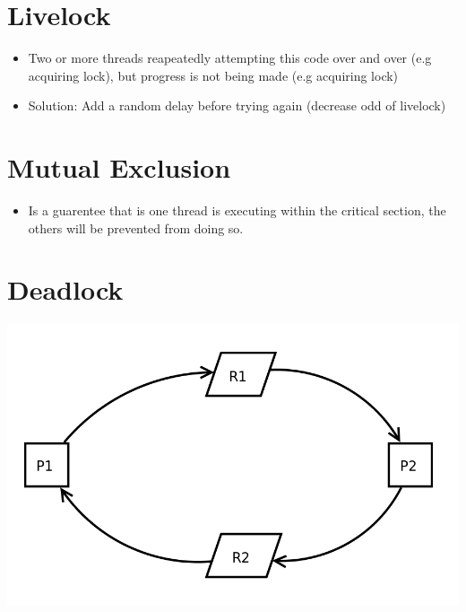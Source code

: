 \documentclass[12pt]{article}
\begin{document}
\section{Livelock}

\begin{itemize}
    \item Two or more threads reapeatedly attempting this code over and over (e.g acquiring lock), but progress is
    not being made (e.g acquiring lock)
    \item Solution: Add a random delay before trying again (decrease odd of livelock)
\end{itemize}

\section{Mutual Exclusion}

\begin{itemize}
    \item Is a guarentee that is one thread is executing within the critical section,
    the others will be prevented from doing so.
\end{itemize}

\section{Deadlock}

\begin{center}
\includegraphics[width=0.6\linewidth]{../images/midterm_2_solution_11.png}
\end{center}
\end{document}
